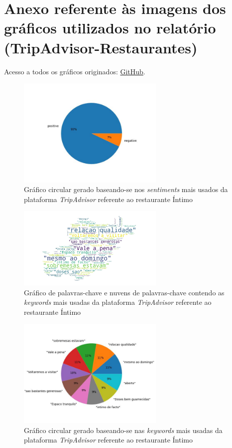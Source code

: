 \chapter{Anexo referente às imagens dos gráficos utilizados no relatório (TripAdvisor-Restaurantes)}

Acesso a todos os gráficos originados: \href{https://github.com/CatKinKitKat/pi2021/tree/master/projecto/datascience/graphs/TripAdvisor/restaurants}{GitHub}.

\label{an2}
\begin{figure}[!htb]
\centering
\includegraphics[width=7cm]{figuras/TripAdvisor/Restaurants/restaurant0_sentiments.jpeg}
\caption{Gráfico circular gerado baseando-se nos \textit{sentiments} mais usados da plataforma \textit{TripAdvisor} referente ao restaurante Íntimo}
\label{fig:exemplofig}
\end{figure}

\begin{figure}[!htb]
\centering
\includegraphics[width=7cm]{figuras/TripAdvisor/Restaurants/restaurant0_keywordcloud.jpeg}
\caption{Gráfico de palavras-chave e nuvens de palavras-chave contendo as \textit{keywords} mais usadas da plataforma \textit{TripAdvisor} referente ao restaurante Íntimo}
\label{fig:exemplofig}
\end{figure}

\begin{figure}[!htb]
\centering
\includegraphics[width=7cm]{figuras/TripAdvisor/Restaurants/restaurant0_keywords.jpeg}
\caption{Gráfico circular gerado baseando-se nas \textit{keywords} mais usadas da plataforma \textit{TripAdvisor} referente ao restaurante Íntimo}
\label{fig:exemplofig}
\end{figure}

